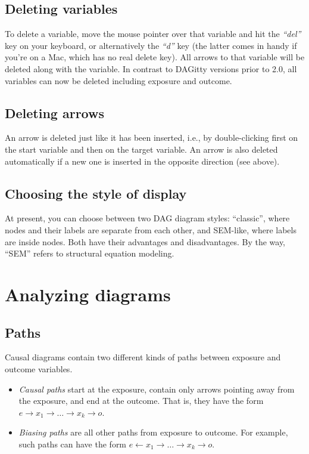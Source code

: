 \documentclass[a4paper]{article} %
\newcommand{\pp}{{\sc DAG}itty\xspace}
\newcommand{\action}[1]{\emph{``#1''}}
\begin{document}
\subsection{Deleting variables}

To delete a variable, move the mouse pointer over that variable 
and hit the \action{del} key on your keyboard, or alternatively
the \action{d} key (the latter comes in handy if you're on a Mac, which 
has no real delete key).
All arrows to that variable will be deleted along 
with the variable. In contrast to \pp versions prior to 2.0,
all variables can now be deleted including exposure and outcome.

\subsection{Deleting arrows}

An arrow is deleted just like it has been inserted, 
i.e., by double-clicking first on the start 
variable and then on the target variable. An arrow 
is also deleted automatically if a new one is 
inserted in the opposite direction (see above). 

\subsection{Choosing the style of display}

At present, you can choose between two DAG diagram styles: ``classic'', where nodes and
their labels are separate from each other, and SEM-like, where labels are inside nodes. 
Both have their advantages and disadvantages. By the way, ``SEM'' refers to structural
equation modeling.

\section{Analyzing diagrams}

\label{sec:diagramanalysis}

\subsection{Paths}

Causal diagrams contain two different kinds of paths between exposure and outcome
variables.

\begin{itemize}
\item \emph{Causal paths} start at the exposure, contain
only arrows pointing away from the exposure, and end at 
the outcome. That is, they have the form
$e \rightarrow x_1 \rightarrow \ldots \rightarrow x_k \rightarrow o$.
\item \emph{Biasing paths} are all other paths from exposure to outcome. For 
example, such paths can have the form 
$e \leftarrow x_1 \rightarrow \ldots \rightarrow x_k \rightarrow o$.
\end{itemize}
\end{document}
